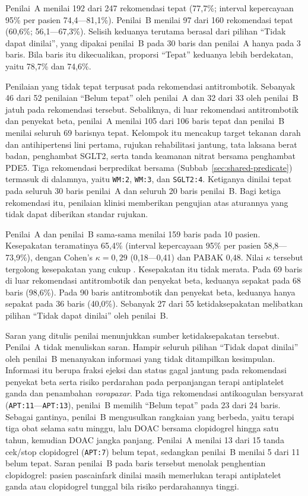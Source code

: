 Penilai~A menilai 192 dari 247 rekomendasi tepat (77,7\%; interval kepercayaan 95\% per
pasien 74,4---81,1\%). Penilai~B menilai 97 dari 160 rekomendasi tepat (60,6\%;
56,1---67,3\%). Selisih keduanya terutama berasal dari pilihan ``Tidak dapat dinilai'', yang
dipakai penilai~B pada 30 baris dan penilai~A hanya pada 3 baris. Bila baris itu
dikecualikan, proporsi ``Tepat'' keduanya lebih berdekatan, yaitu 78,7\% dan 74,6\%.

Penilaian yang tidak tepat terpusat pada rekomendasi antitrombotik. Sebanyak 46 dari 52
penilaian ``Belum tepat'' oleh penilai~A dan 32 dari 33 oleh penilai~B jatuh pada rekomendasi
tersebut. Sebaliknya, di luar rekomendasi antitrombotik dan penyekat beta, penilai~A menilai
105 dari 106 baris tepat dan penilai~B menilai seluruh 69 barisnya tepat. Kelompok itu
mencakup target tekanan darah dan antihipertensi lini pertama, rujukan rehabilitasi jantung,
tata laksana berat badan, penghambat SGLT2, serta tanda keamanan nitrat bersama penghambat
PDE5. Tiga rekomendasi berpredikat bersama (Subbab~\ref{sec:shared-predicate}) termasuk di
dalamnya, yaitu \texttt{WM:2}, \texttt{WM:3}, dan \texttt{SGLT2:4}. Ketiganya dinilai tepat
pada seluruh 30 baris penilai~A dan seluruh 20 baris penilai~B. Bagi ketiga rekomendasi itu,
penilaian klinisi memberikan pengujian atas aturannya yang tidak dapat diberikan standar
rujukan.

Penilai~A dan penilai~B sama-sama menilai 159 baris pada 10 pasien. Kesepakatan teramatinya
65,4\% (interval kepercayaan 95\% per pasien 58,8---73,9\%), dengan Cohen's
$\kappa = 0{,}29$ (0,18---0,41) dan PABAK 0,48. Nilai $\kappa$ tersebut tergolong
kesepakatan yang cukup \cite{landis1977}. Kesepakatan itu tidak merata. Pada 69 baris di luar
rekomendasi antitrombotik dan penyekat beta, keduanya sepakat pada 68 baris (98,6\%). Pada 90
baris antitrombotik dan penyekat beta, keduanya hanya sepakat pada 36 baris (40,0\%). Sebanyak
27 dari 55 ketidaksepakatan melibatkan pilihan ``Tidak dapat dinilai'' oleh penilai~B.

Saran yang ditulis penilai menunjukkan sumber ketidaksepakatan tersebut. Penilai~A tidak
menuliskan saran. Hampir seluruh pilihan ``Tidak dapat dinilai'' oleh penilai~B menanyakan
informasi yang tidak ditampilkan kesimpulan. Informasi itu berupa fraksi ejeksi dan status
gagal jantung pada rekomendasi penyekat beta serta risiko perdarahan pada perpanjangan terapi
antiplatelet ganda dan penambahan \emph{vorapaxar}. Pada tiga rekomendasi antikoagulan bersyarat
(\texttt{APT:11}---\texttt{APT:13}), penilai~B memilih ``Belum tepat'' pada 23 dari 24 baris.
Sebagai gantinya, penilai~B mengusulkan rangkaian yang berbeda, yaitu terapi tiga obat selama satu minggu, lalu DOAC
bersama clopidogrel hingga satu tahun, kemudian DOAC jangka panjang. Penilai~A menilai 13 dari
15 tanda cek/stop clopidogrel (\texttt{APT:7}) belum tepat, sedangkan penilai~B menilai 5 dari
11 belum tepat. Saran penilai~B pada baris tersebut menolak penghentian clopidogrel: pasien
pascainfark dinilai masih memerlukan terapi antiplatelet ganda atau clopidogrel tunggal bila
risiko perdarahannya tinggi.


